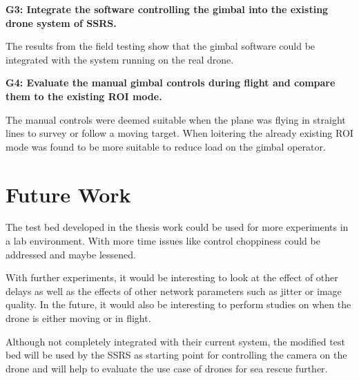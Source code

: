 \documentclass[nofilelist]{cslthse-msc}
\begin{document}
\begin{description}
   \item \textbf{G3: Integrate the software controlling the gimbal into the existing drone system of SSRS.}

   \item
   The results from the field testing show that the gimbal software could be integrated with the system running on the real drone.

   \item \textbf{G4: Evaluate the manual gimbal controls during flight and compare them to the existing ROI mode.}
   \item
   The manual controls were deemed suitable when the plane was flying in straight lines to survey or follow a moving target. When loitering the already existing ROI mode was found to be more suitable to reduce load on the gimbal operator.

\end{description}

\chapter{Future Work}
The test bed developed in the thesis work could be used for more experiments in a lab environment. With more time issues like control choppiness could be addressed and maybe lessened.

With further experiments, it would be interesting to look at the effect of other delays as well as the effects of other network parameters such as jitter or image quality. In the future, it would also be interesting to perform studies on when the drone is either moving or in flight.

Although not completely integrated with their current system, the modified test bed will be used by the SSRS as starting point for controlling the camera on the drone and will help to evaluate the use case of drones for sea rescue further.

{}
\end{document}

